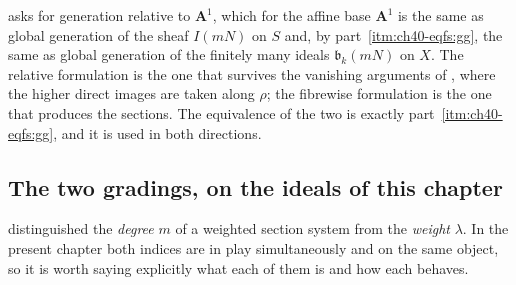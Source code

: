 \begin{remark}
\label{rem:ch40-relative-generation}
 asks for generation relative to
$\mathbf A^1$, which for the affine base $\mathbf A^1$ is the same as
global generation of the sheaf $I(mN)$ on $S$ and, by
part~\cref{itm:ch40-eqfs:gg}, the same as global generation of the finitely
many ideals $\mathfrak b_k(mN)$ on $X$.  The relative formulation is the
one that survives the vanishing arguments of , where
the higher direct images are taken along $\rho$; the fibrewise formulation
is the one that produces the sections.  The equivalence of the two is
exactly part~\cref{itm:ch40-eqfs:gg}, and it is used in both directions.
\end{remark}

\subsection{The two gradings, on the ideals of this chapter}
\label{sec:ch40-two-gradings}

 distinguished the \emph{degree} $m$ of a
weighted section system from the \emph{weight} $\lambda$.  In the present
chapter both indices are in play simultaneously and on the same object, so
it is worth saying explicitly what each of them is and how each behaves.

